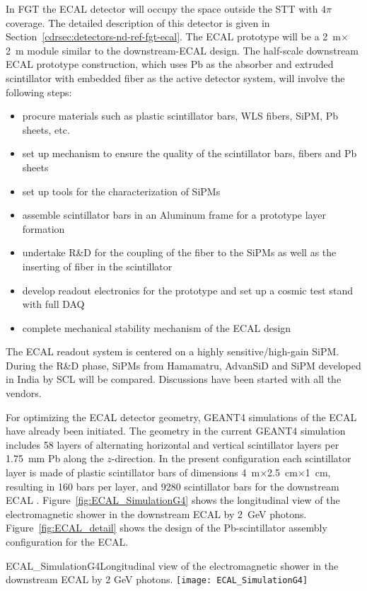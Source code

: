 In FGT the ECAL detector will occupy the space outside
the STT with $4\pi$ coverage.  The detailed description of this
detector is given in Section~\ref{cdrsec:detectors-nd-ref-fgt-ecal}.
The ECAL prototype will be a 2~m$\times$2~m module similar to the
downstream-ECAL design.  The half-scale downstream ECAL prototype
construction, which uses Pb as the absorber and extruded scintillator
with embedded fiber as the active detector system, will involve the
following steps:
\begin{itemize}
\item procure materials such as plastic scintillator bars, WLS fibers,
  SiPM, Pb sheets, etc.
\item set up mechanism to ensure the quality of the scintillator bars,
  fibers and Pb sheets
\item set up tools for the characterization of SiPMs
\item assemble scintillator bars in an Aluminum frame for a
  prototype layer formation
\item undertake R\&D for the coupling of the fiber to the SiPMs as well
  as the inserting of fiber in the scintillator
\item develop readout electronics for the prototype and set up a cosmic
  test stand with full DAQ
\item complete mechanical stability mechanism of the ECAL design 
\end{itemize}

The ECAL readout system is centered on a highly sensitive/high-gain SiPM. %
During the R\&D phase, SiPMs from Hamamatru, AdvanSiD and SiPM developed in India by SCL will be compared. 
Discussions have been started with all the vendors.


For optimizing the ECAL detector geometry, %
GEANT4
simulations of the ECAL have already been initiated. The geometry in
the current GEANT4 simulation includes 58 layers of alternating
horizontal and vertical scintillator layers per 1.75~mm Pb along the
$z$-direction. In
the present configuration each scintillator layer is made of plastic scintillator
bars of dimensions 4~m$\times$2.5~cm$\times$1~cm, resulting in 160
bars per layer, and \num{9280} scintillator bars for the downstream ECAL .  
Figure~\ref{fig:ECAL_SimulationG4} shows
the longitudinal view of the electromagnetic shower in the downstream
ECAL by 2~GeV photons. Figure~\ref{fig:ECAL_detail} shows the design
of the Pb-scintillator assembly configuration for the ECAL.
\begin{cdrfigure}
{ECAL_SimulationG4}{Longitudinal view of the electromagnetic shower in
the downstream ECAL by 2 GeV photons.}
\texttt{[image: ECAL\_SimulationG4]}
\end{cdrfigure}

